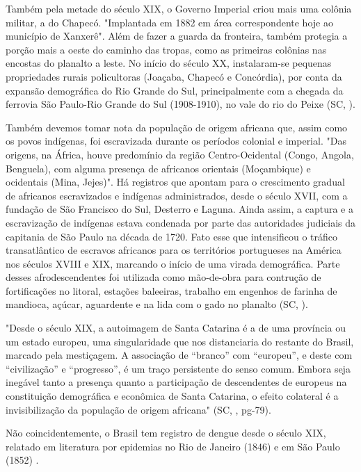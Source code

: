 \indent Também pela metade do século XIX, o Governo Imperial criou mais uma colônia militar, a do Chapecó. "Implantada em 1882 em área correspondente hoje ao município de Xanxerê". Além de fazer a guarda da fronteira, também protegia a porção mais a oeste do caminho das tropas, como as primeiras colônias nas encostas do planalto a leste. No início do século XX, instalaram-se pequenas propriedades rurais policultoras (Joaçaba, Chapecó e Concórdia), por conta da expansão demográfica do Rio Grande do Sul, principalmente com a chegada da ferrovia São Paulo-Rio Grande do Sul (1908-1910), no vale do rio do Peixe (\acrlong{SC}, \citeyear{AtlasSCpopulacao}).

\indent Também devemos tomar nota da população de origem africana que, assim como os povos indígenas, foi escravizada durante os períodos colonial e imperial. "Das origens, na África, houve predomínio da região Centro-Ocidental (Congo, Angola, Benguela), com alguma presença de africanos orientais (Moçambique) e ocidentais (Mina, Jejes)". Há registros que apontam para o crescimento gradual de africanos escravizados e indígenas administrados, desde o século XVII, com a fundação de São Francisco do Sul, Desterro e Laguna. Ainda assim, a captura e a escravização de indígenas estava condenada por parte das autoridades judiciais da capitania de São Paulo na década de 1720. Fato esse que intensificou o tráfico transatlântico de escravos africanos para os territórios portugueses na América nos séculos XVIII e XIX, marcando o início de uma virada demográfica. Parte desses afrodescendentes foi utilizada como mão-de-obra para contrução de fortificações no litoral, estações baleeiras, trabalho em engenhos de farinha de mandioca, açúcar, aguardente e na lida com o gado no planalto (\acrlong{SC}, \citeyear{AtlasSCpopulacao}). 

\begin{citacao}
"Desde o século XIX, a autoimagem de Santa Catarina é a de uma província ou um estado europeu, uma singularidade que nos distanciaria do restante do Brasil, marcado pela mestiçagem. A associação de “branco” com “europeu”, e deste com “civilização” e “progresso”, é um traço persistente do senso comum. Embora seja
inegável tanto a presença quanto a participação de descendentes de europeus na
constituição demográfica e econômica de Santa Catarina, o efeito colateral é a invisibilização da população de origem africana" (\acrlong{SC}, \citeyear{AtlasSCpopulacao}, pg-79).
\end{citacao}

\indent Não coincidentemente, o Brasil tem registro de dengue desde o século XIX, relatado em literatura por epidemias no Rio de Janeiro (1846) e em São Paulo (1852) \cite{Valle2015Dengue}.

